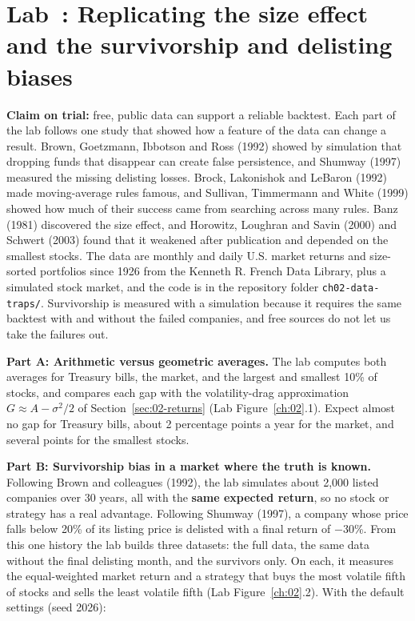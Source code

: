 \section{Lab~\thechapter: Replicating the size effect and the survivorship and delisting biases}
\label{sec:02-lab}

\textbf{Claim on trial:} free, public data can support a reliable backtest. Each part of the lab follows one study that showed how a feature of the data can change a result. Brown, Goetzmann, Ibbotson and Ross (1992) showed by simulation that dropping funds that disappear can create false persistence, and Shumway (1997) measured the missing delisting losses. Brock, Lakonishok and LeBaron (1992) made moving-average rules famous, and Sullivan, Timmermann and White (1999) showed how much of their success came from searching across many rules. Banz (1981) discovered the size effect, and Horowitz, Loughran and Savin (2000) and Schwert (2003) found that it weakened after publication and depended on the smallest stocks. The data are monthly and daily U.S. market returns and size-sorted portfolios since 1926 from the Kenneth R. French Data Library, plus a simulated stock market, and the code is in the repository folder \texttt{ch02-data-traps/}. Survivorship is measured with a simulation because it requires the same backtest with and without the failed companies, and free sources do not let us take the failures out.

\textbf{Part A: Arithmetic versus geometric averages.} The lab computes both averages for Treasury bills, the market, and the largest and smallest 10\% of stocks, and compares each gap with the volatility-drag approximation $G \approx A - \sigma^2/2$ of Section~\ref{sec:02-returns} (Lab Figure~\ref{ch:02}.1). Expect almost no gap for Treasury bills, about 2 percentage points a year for the market, and several points for the smallest stocks.

\textbf{Part B: Survivorship bias in a market where the truth is known.} Following Brown and colleagues (1992), the lab simulates about 2,000 listed companies over 30 years, all with the \textbf{same expected return}, so no stock or strategy has a real advantage. Following Shumway (1997), a company whose price falls below 20\% of its listing price is delisted with a final return of $-30$\%. From this one history the lab builds three datasets: the full data, the same data without the final delisting month, and the survivors only. On each, it measures the equal-weighted market return and a strategy that buys the most volatile fifth of stocks and sells the least volatile fifth (Lab Figure~\ref{ch:02}.2). With the default settings (seed 2026):

